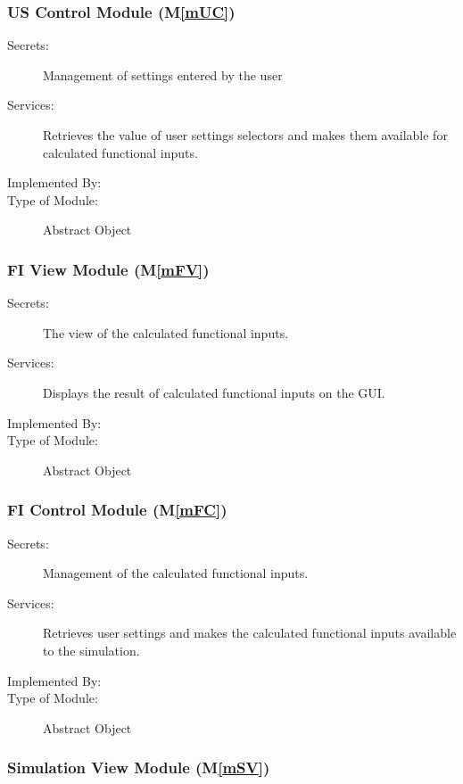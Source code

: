 \documentclass[12pt, titlepage]{article}
\newcommand{\mref}[1]{M\ref{#1}}
\begin{document}
\subsubsection{US Control Module (\mref{mUC})}

\begin{description}
\item[Secrets:]Management of settings entered by the user
\item[Services:]Retrieves the value of user settings selectors and makes them available for calculated functional inputs.
\item[Implemented By:] \progname
\item[Type of Module:] Abstract Object
\end{description}

\subsubsection{FI View Module (\mref{mFV})}

\begin{description}
\item[Secrets:]The view of the calculated functional inputs.
\item[Services:]Displays the result of calculated functional inputs on the GUI.
\item[Implemented By:] \progname
\item[Type of Module:] Abstract Object
\end{description}

\subsubsection{FI Control Module (\mref{mFC})}

\begin{description}
\item[Secrets:]Management of the calculated functional inputs.
\item[Services:]Retrieves user settings and makes the calculated functional inputs available to the simulation.
\item[Implemented By:] \progname
\item[Type of Module:] Abstract Object
\end{description}

\subsubsection{Simulation View Module (\mref{mSV})}
\end{document}
